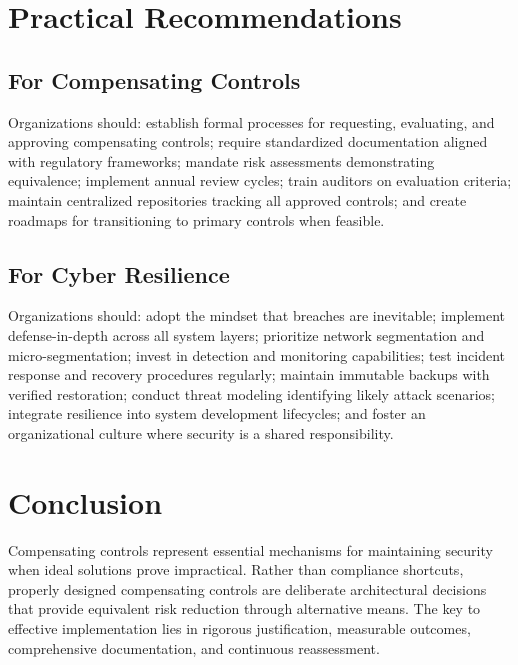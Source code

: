 \documentclass[sigconf,nonacm]{acmart}
\begin{document}
\section{Practical Recommendations}

\subsection{For Compensating Controls}

Organizations should: establish formal processes for requesting, evaluating, and
approving compensating controls; require standardized documentation aligned with
regulatory frameworks; mandate risk assessments demonstrating equivalence; implement
annual review cycles; train auditors on evaluation criteria; maintain centralized
repositories tracking all approved controls; and create roadmaps for transitioning to
primary controls when feasible.

\subsection{For Cyber Resilience}

Organizations should: adopt the mindset that breaches are inevitable; implement
defense-in-depth across all system layers; prioritize network segmentation and
micro-segmentation; invest in detection and monitoring capabilities; test incident
response and recovery procedures regularly; maintain immutable backups with verified
restoration; conduct threat modeling identifying likely attack scenarios; integrate
resilience into system development lifecycles; and foster an organizational culture
where security is a shared responsibility.

\section{Conclusion}

Compensating controls represent essential mechanisms for maintaining security when ideal
solutions prove impractical. Rather than compliance shortcuts, properly designed
compensating controls are deliberate architectural decisions that provide equivalent risk
reduction through alternative means. The key to effective implementation lies in rigorous
justification, measurable outcomes, comprehensive documentation, and continuous
reassessment.
\end{document}
